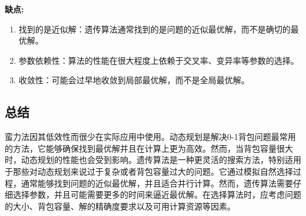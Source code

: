 \documentclass[UTF8,titlepage]{ctexart}
\numberwithin{figure}{section}
\begin{document}
\textbf{缺点:}
\begin{enumerate}
    \item 找到的是近似解：遗传算法通常找到的是问题的近似最优解，而不是确切的最优解。
    \item 参数依赖性：算法的性能在很大程度上依赖于交叉率、变异率等参数的选择。
    \item 收敛性：可能会过早地收敛到局部最优解，而不是全局最优解。
\end{enumerate}

\subsection*{总结}

蛮力法因其低效性而很少在实际应用中使用。动态规划是解决0-1背包问题最常用的方法，它能够确保找到最优解并且在计算上更为高效。然而，当背包容量很大时，动态规划的性能也会受到影响。遗传算法是一种更灵活的搜索方法，特别适用于那些对动态规划来说过于复杂或者背包容量过大的问题。它通过模拟自然选择过程，通常能够找到问题的近似最优解，并且适合并行计算。然而，遗传算法需要仔细选择参数，并且可能需要更多的时间来逼近最优解。在选择算法时，应考虑问题的大小、背包容量、解的精确度要求以及可用计算资源等因素。
\end{document}
